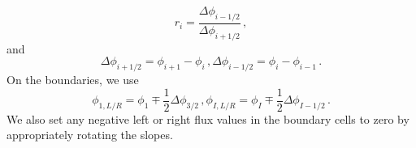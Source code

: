 	\begin{equation}
		r_i = \frac{\Delta\phi_{i-1/2}}{\Delta \phi_{i+1/2}} \,,
	\end{equation}
and
	\begin{subequations}
		\begin{equation}
			\Delta \phi_{i+1/2} = \phi_{i+1} - \phi_i \,, 
		\end{equation}
		\begin{equation}
			\Delta \phi_{i-1/2} = \phi_i - \phi_{i-1} \,.
		\end{equation}
	\end{subequations}
On the boundaries, we use 
	\begin{subequations}
		\begin{equation}
			\phi_{1,L/R} = \phi_1 \mp \frac{1}{2} \Delta \phi_{3/2} \,,
		\end{equation}
		\begin{equation}
			\phi_{I,L/R} = \phi_I \mp \frac{1}{2} \Delta \phi_{I-1/2} \,.
		\end{equation}
	\end{subequations}
We also set any negative left or right flux values in the boundary cells to zero by appropriately rotating the slopes.
